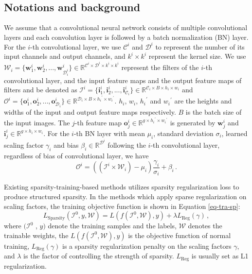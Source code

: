 \documentclass[review]{cvpr}
\begin{document}
\subsection{Notations and background}\label{Notations-and-background}
We assume that a convolutional neural network consists of multiple convolutional layers and each convolution layer is followed by a batch normalization (BN) \cite{ioffe2015batch} layer. For the $i$-th convolutional layer, we use ${\mathcal{C}}^i$ and ${\mathcal{D}}^i$ to represent the number of its input channels and output channels, and $k^i\times k^i$ represent the kernel size. We use $\mathcal{W}_i = \{ \mathbf{w}_1^i, \mathbf{w}_2^i, ..., \mathbf{w}_{ \mathcal{D}^i_i}^i \} \in \mathbb{R}^{{\mathcal{C}}^i \times {\mathcal{D}}^i \times k^i \times k^i}$  represent the filters of the  $i$-th convolutional layer, and the input feature maps and the output feature maps of filters and be denoted as $\mathcal{I}^i = \{ \mathbf{i}_1^i, \mathbf{i}_2^i, ..., \mathbf{i}_{\mathcal{C}_i}^i \} \in \mathbb{R}^{{\mathcal{C}_i} \times B \times h_i \times w_i}$ and $\mathcal{O}^i = \{ \mathbf{o}_1^i, \mathbf{o}_2^i, ..., \mathbf{o}_{\mathcal{D}_i}^i \} \in \mathbb{R}^{{\mathcal{D}_i} \times B \times {h_i}^\prime \times {w_i}^\prime}$. $h_i$, $w_i$, ${h_i}^\prime$ and ${w_i}^\prime$ are the heights and widths of the input and output feature maps respectively. $B$ is the batch size of the input images. The $j$-th feature map $\mathbf{o}_j^i \in \mathbb{R}^{g \times {h_i}^\prime \times {w_i}^\prime}$ is generated by $\mathbf{w}_j^i$ and $\mathbf{i}_j^i \in \mathbb{R}^{g \times h_i \times w_i}$. For the $i$-th BN layer with mean ${\mu}_i$, standard deviation ${\sigma}_i$, learned scaling factor ${\gamma}_i$ and bias ${\beta}_i\in\mathbb{R}^{\mathcal{D}^i}$ following the $i$-th convolutional layer, regardless of bias of convolutional layer, we have  
\begin{equation}\label{eq-conv-bn}
	\mathcal{O}^i = ((\mathcal{I}^i \times  \mathcal{W}_i) - \mu_i)\frac{\gamma_i}{\sigma_i} + \beta_i \,.
\end{equation}

Existing sparsity-training-based methods utilizes sparsity
regularization loss to produce structured sparsity. In the methods which apply sparse regularization on scaling factors, the training objective function is shown in Equation \ref{eq-tra-sp}:  
\begin{equation}\label{eq-tra-sp}
L_{\text{Sparsity}}(\mathcal{I}^0, y, \mathcal{W}) = L(f(\mathcal{I}^0, \mathcal{W}), y) + \lambda L_\text{Reg}({\gamma}) \,,
\end{equation}
where $( \mathcal{I}^0$ , $y )$  denote the training samples  and the labels, $\mathcal{W}$ denotes the trainable weights, the $L(f(\mathcal{I}^0, \mathcal{W}), y)$ is the objective function of normal training, $L_\text{Reg}({\gamma})$ is a sparsity regularization penalty on the scaling factors $\gamma$, and $\lambda$ is the factor of controlling the strength of sparsity. $L_\text{Reg}$ is usually set as L1 regularization.
\end{document}

